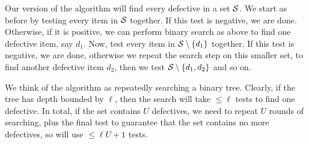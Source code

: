\begin{remark} \label{rem:algo}
Our version of the algorithm will find every defective in a set ${\mathcal{S}}$. We start as before by testing every item in ${\mathcal{S}}$ together. If this test is negative, we are done.
Otherwise, if it is positive, we can perform binary search as above to find one defective item, say $d_1$. Now, test every item in ${\mathcal{S}} \setminus \{ d_1 \}$ together.
If this test is negative, we are done, otherwise we repeat the search step on this smaller set, to find another defective item
$d_2$, then we test ${\mathcal{S}} \setminus \{ d_1, d_2 \}$ and so on.

We think of the algorithm as repeatedly searching a binary tree. Clearly, if the tree has depth bounded by $\ell$, then the search will take $ \leq \ell$ tests to find one defective. In total, 
if the set contains $U$ defectives, we need to repeat $U$ rounds of searching, plus the final test to guarantee that the set contains no more defectives, so will use $\leq \ell U + 1$ tests.
\end{remark}

